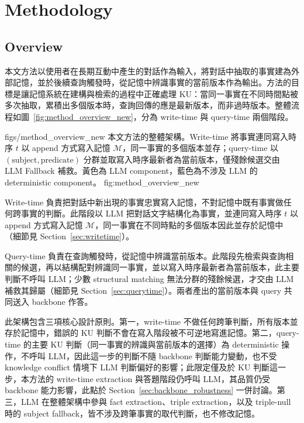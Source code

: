 \chapter{Methodology}
\label{ch:methodology}
 
\section{Overview}
\label{sec:method_overview}
本文方法以使用者在長期互動中產生的對話作為輸入，將對話中抽取的事實建為外部記憶，並於後續查詢觸發時，從記憶中辨識事實的當前版本作為輸出。方法的目標是讓記憶系統在建構與檢索的過程中正確處理 KU：當同一事實在不同時間點被多次抽取，累積出多個版本時，查詢回傳的應是最新版本，而非過時版本。整體流程如圖~\ref{fig:method_overview_new}，分為 write-time 與 query-time 兩個階段。
 
\figt{\textwidth}
{figs/method_overview_new}
{本文方法的整體架構。Write-time 將事實連同寫入時序 $t$ 以 append 方式寫入記憶 $\mathcal{M}$，同一事實的多個版本並存；query-time 以 $(\text{subject}, \text{predicate})$ 分群並取寫入時序最新者為當前版本，僅殘餘候選交由 LLM Fallback 補救。黃色為 LLM component，藍色為不涉及 LLM 的 deterministic component。}
{fig:method_overview_new}
{}
 
Write-time 負責把對話中新出現的事實忠實寫入記憶，不對記憶中既有事實做任何跨事實的判斷。此階段以 LLM 把對話文字結構化為事實，並連同寫入時序 $t$ 以 append 方式寫入記憶 $\mathcal{M}$，同一事實在不同時點的多個版本因此並存於記憶中（細節見 Section~\ref{sec:writetime}）。
 
Query-time 負責在查詢觸發時，從記憶中辨識當前版本。此階段先檢索與查詢相關的候選，再以結構配對辨識同一事實，並以寫入時序最新者為當前版本，此主要判斷不呼叫 LLM；少數 structural matching 無法分群的殘餘候選，才交由 LLM 補救其歸屬（細節見 Section~\ref{sec:querytime}）。兩者產出的當前版本與 query 共同送入 backbone 作答。
 
此架構包含三項核心設計原則。第一，write-time 不做任何跨筆判斷，所有版本並存於記憶中，錯誤的 KU 判斷不會在寫入階段被不可逆地寫進記憶。第二，query-time 的主要 KU 判斷（同一事實的辨識與當前版本的選擇）為 deterministic 操作，不呼叫 LLM，因此這一步的判斷不隨 backbone 判斷能力變動，也不受 knowledge conflict 情境下 LLM 判斷偏好的影響；此限定僅及於 KU 判斷這一步，本方法的 write-time extraction 與答題階段仍呼叫 LLM，其品質仍受 backbone 能力影響，此點於 Section~\ref{sec:backbone_robustness} 一併討論。第三，LLM 在整體架構中參與 fact extraction、triple extraction，以及 triple-null 時的 subject fallback，皆不涉及跨筆事實的取代判斷，也不修改記憶。
 
